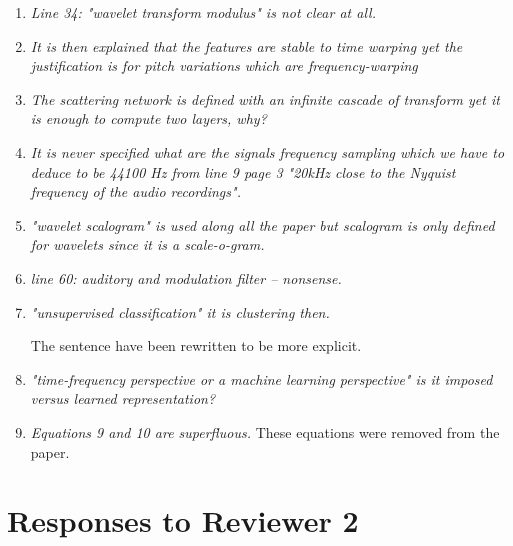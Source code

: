 \documentclass[10pt]{article}
\begin{document}
\begin{enumerate}
\item \emph{Line 34: "wavelet transform modulus" is not clear at all.}

\item \emph{It is then explained that the features are stable to time warping yet the justification is for pitch variations which are frequency-warping}

\item \emph{The scattering network is defined with an infinite cascade of transform yet it is enough to compute two layers, why?}

\item \emph{It is never specified what are the signals frequency sampling which we have to deduce to be 44100 Hz from line 9 page 3 "20kHz close to the Nyquist frequency of the audio recordings".}

\item \emph{"wavelet scalogram" is used along all the paper but scalogram is only defined for wavelets since 
it is a scale-o-gram.}

\item \emph{line 60: auditory and modulation filter – nonsense.}

\item \emph{"unsupervised classification" it is clustering then.}

The sentence have been rewritten to be more explicit.

\item \emph{"time-frequency perspective or a machine learning perspective" is it imposed versus learned representation? }

\item \emph{Equations 9 and 10 are superfluous.}
These equations were removed from the paper.

\end{enumerate}

\section{Responses to Reviewer 2}
\end{document}
